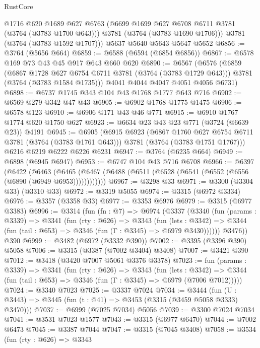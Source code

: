\begin{lexlean}{RustCore}
\begin{coremodule}
        @1716
        @620
        @1689
        @627
        @6763
        (@6699 @1699 @627 @6708 @6711 @3781 (@3764 (@3783 @1700 @643)))
        @3781
        (@3764 (@3783 @1690 @1706)))
      @3781
      (@3764 (@3783 @1592 @1707)))
    @5637
    @5640
    @5643
    @5647
    @5652
@6856 := @3764 (@5656 @664)
@6859 := @6588 (@6594 (@6854 @6856))
@6867 := @6578 @169 @73 @43 @45 @917 @643 @660 @620
@6890 := @6567
    (@6576
      (@6859
        (@6867 @1728 @627 @6754 @6711 @3781 (@3764 (@3783 @1729 @643)))
        @3781
        (@3764 (@3783 @1584 @1735)))
      @4041
      @4044
      @4047
      @4051
      @4056
      @6731)
@6898 := @6737 @1745 @343 @104 @43 @1768 @1777 @643 @716
@6902 := @6569 @279 @342 @47 @43
@6905 := @6902 @1768 @1775 @1475
@6906 := @6578 @123
@6910 := @6906 @171 @43 @46 @771
@6915 := @6910 @1767 @1774 @620 @1750 @627
@6923 := @6634 @23 @43 @23 @771 (@3724 (@6639 @23)) @4191
@6945 := @6905
    (@6915
      @6923
      (@6867 @1760 @627 @6754 @6711 @3781 (@3764 (@3783 @1761 @643)))
      @3781
      (@3764 (@3783 @1751 @1767)))
    @6216
    @6219
    @6222
    @6226
    @6231
@6947 := @3764 (@6235 @664)
@6949 := @6898 (@6945 @6947)
@6953 := @6747 @104 @43 @716 @6708
@6966 := @6397
    (@6422
      (@6463 (@6465 (@6467 (@6488 (@6511 (@6528 (@6541 (@6552 (@6556 (@6890 (@6949 @6953))))))))))))
@6967 := @3298 @33
@6971 := @3300 (@3304 @33) (@3310 @33)
@6972 := @3319 @5055
@6974 := @3315 (@6972 @3334)
@6976 := @3357 (@3358 @33)
@6977 := @3353 @6976
@6979 := @3315 (@6977 @3383)
@6996 := @3314
    (fun (fn : @7) =>
    @6974
      (@3337
        (@3340
          (fun (params : @3339) =>
          @3341
            (fun (rty : @626) =>
            @3343
              (fun (lets : @3342) =>
              @3344 (fun (tail : @653) => @3346 (fun (Γ : @3345) => @6979 @3430))))))
        @3476))
    @390
@6999 := @3482 (@6972 (@3332 @390))
@7002 := @3395 (@3396 @390) @5058
@7006 := @3315 (@3387 (@7002 @3404) @3408)
@7007 := @3421 @390
@7012 := @3418 (@3420 @7007 @5061 @3376 @3378)
@7023 := fun (params : @3339) =>
  @3341
    (fun (rty : @626) =>
    @3343
      (fun (lets : @3342) =>
      @3344 (fun (tail : @653) => @3346 (fun (Γ : @3345) => @6979 (@7006 @7012)))))
@7024 := @3340 @7023
@7025 := @3337 @7024
@7034 := @3444 (fun (U : @3443) => @3445 (fun (t : @41) => @3453 (@3315 (@3459 @5058 @3333) @3470)))
@7037 := @6999 (@7025 @7034) @5056
@7039 := @3300 @7024 @7034
@7041 := @3531 @7023 @1577
@7043 := @3315 (@6977 @6470)
@7044 := @7002 @6473
@7045 := @3387 @7044
@7047 := @3315 (@7045 @3408)
@7058 := @3534
    (fun (rty : @626) =>
    @3343

\end{coremodule}
\end{lexlean}
